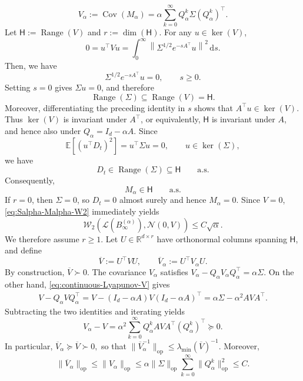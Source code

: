 \documentclass[11pt,letterpaper]{article}
\theoremstyle{plain}
\theoremstyle{definition}
\theoremstyle{remark}
\newcommand{\E}{\mathbb{E}}
\newcommand{\R}{\mathbb{R}}
\newcommand{\W}{\mathcal{W}}
\newcommand{\law}{\mathcal{L}}
\begin{document}
\[
    V_\alpha
    :=
    \operatorname{Cov}(M_\alpha)
    =
    \alpha
    \sum_{k=0}^{\infty}
    Q_\alpha^k\Sigma(Q_\alpha^k)^\top.
\]
Let $\mathsf H:=\operatorname{Range}(V)$ and $r:=\dim(\mathsf H).$ For any \(u\in\ker(V)\),
\[
    0
    =
    u^\top Vu
    =
    \int_0^\infty
    \left\|
        \Sigma^{1/2}e^{-sA^\top}u
    \right\|^2
    \,\mathrm ds.
\]
Then, we have
\[
    \Sigma^{1/2}e^{-sA^\top}u=0,
    \qquad s\geq0.
\]
Setting \(s=0\) gives \(\Sigma u=0\), and therefore
\[
    \operatorname{Range}(\Sigma)\subseteq\operatorname{Range}(V)=\mathsf H.
\]
Moreover, differentiating the preceding identity in \(s\) shows that
\(A^\top u\in\ker(V)\). Thus \(\ker(V)\) is invariant under \(A^\top\),
or equivalently, \(\mathsf H\) is invariant under \(A\), and hence also
under \(Q_\alpha=I_d-\alpha A\). Since
\[
    \E[(u^\top D_t)^2]
    =
    u^\top\Sigma u
    =
    0,
    \qquad
    u\in\ker(\Sigma),
\]
we have
\[
    D_t\in\operatorname{Range}(\Sigma)\subseteq\mathsf H
    \qquad\text{a.s.}
\]
Consequently,
\[
    M_\alpha\in\mathsf H
    \qquad\text{a.s.}
\]
If \(r=0\), then \(\Sigma=0\), so \(D_t=0\) almost surely and hence
\(M_\alpha=0\). Since \(V=0\), \eqref{eq:Salpha-Malpha-W2} immediately
yields
\[
    \W_2\left(
        \law(B_\infty^{(\alpha)}),
        \mathcal N(0,V)
    \right)
    \leq
    C\sqrt{\alpha}.
\]
We therefore assume \(r\geq1\). Let \(U\in\R^{d\times r}\) have orthonormal columns spanning
\(\mathsf H\), and define
\[
    \overline V:=U^\top VU,
    \qquad
    \overline V_\alpha:=U^\top V_\alpha U.
\]
By construction, \(\overline V\succ0\). The covariance \(V_\alpha\) satisfies $V_\alpha-Q_\alpha V_\alpha Q_\alpha^\top
    =
    \alpha\Sigma.$ On the other hand, \eqref{eq:continuous-Lyapunov-V} gives
\begin{align*}
    V-Q_\alpha VQ_\alpha^\top
    =
    V-(I_d-\alpha A)V(I_d-\alpha A)^\top=
    \alpha\Sigma-\alpha^2AVA^\top.
\end{align*}
Subtracting the two identities and iterating yields
\begin{equation}
\label{eq:Valpha-minus-V}
    V_\alpha-V
    =
    \alpha^2
    \sum_{k=0}^{\infty}
    Q_\alpha^kAVA^\top(Q_\alpha^k)^\top
    \succeq0.
\end{equation}
In particular, $\overline V_\alpha
    \succeq
    \overline V
    \succ0,$ so that $\|\overline V_\alpha^{-1}\|_{\mathrm{op}}
    \leq
    \lambda_{\min}(\overline V)^{-1}.$ Moreover,
\[
    \|\overline V_\alpha\|_{\mathrm{op}}
    \leq
    \|V_\alpha\|_{\mathrm{op}}
    \leq
    \alpha\|\Sigma\|_{\mathrm{op}}
    \sum_{k=0}^{\infty}
    \|Q_\alpha^k\|_{\mathrm{op}}^2
    \leq C.
\]
\end{document}
